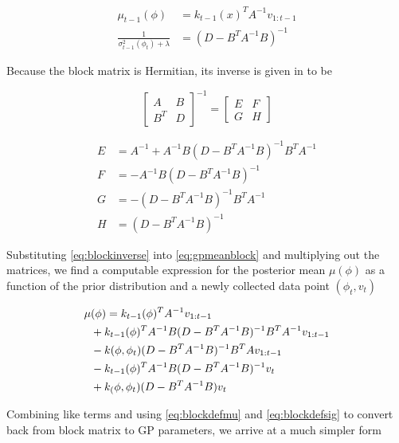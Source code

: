 \documentclass[letterpaper, 10 pt, conference]{ieeeconf}  %
\begin{document}
\begin{align}
    \mu_{t-1}(\phi) &= k_{t-1}(x)^T A^{-1} v_{1:t-1} \label{eq:blockdefmu}\\ 
    \frac{1}{\sigma_{t-1}^2(\phi_t)+\lambda} &= (D-B^T A^{-1}B)^{-1} \label{eq:blockdefsig}
\end{align}
\smallskip

Because the block matrix is Hermitian, its inverse is given in \cite{lu02} to be

\begin{equation}
    \begin{bmatrix}
        A & B \\
        B^T & D
    \end{bmatrix}^{-1}
    =
    \begin{bmatrix}
        E & F \\
        G & H
    \end{bmatrix}
    \label{eq:blockinverse}
\end{equation}

\begin{align}
    E &= A^{-1}+A^{-1}B(D-B^T A^{-1} B)^{-1}B^T A^{-1} \nonumber \\
    F &= -A^{-1}B(D-B^T A^{-1} B)^{-1} \nonumber \\
    G &= -(D-B^T A^{-1} B)^{-1}B^T A^{-1} \nonumber \\
    H &= (D-B^T A^{-1} B)^{-1} \nonumber
\end{align}
\smallskip

Substituting \eqref{eq:blockinverse} into \eqref{eq:gpmeanblock} and multiplying out the matrices, we find a computable expression for the posterior mean $\mu(\phi)$ as a function of the prior distribution and a newly collected data point $(\phi_t,v_t)$

\begin{align}
\begin{split}
    \tiny
    \mu&(\phi) = k_{t-1}(\phi)^T A^{-1} v_{1:t-1} \\
    &+ k_{t-1}(\phi)^T A^{-1} B (D-B^T A^{-1} B)^{-1} B^T A^{-1} v_{1:t-1} \\
    &- k(\phi,\phi_t)(D-B^T A^{-1} B)^{-1} B^T A v_{1:t-1} \\
    &- k_{t-1}(\phi)^T A^{-1} B(D-B^T A^{-1}B)^{-1}v_t \\
    &+ k_(\phi,\phi_t)(D-B^T A^{-1}B)v_t
\end{split}
\end{align}

Combining like terms and using \eqref{eq:blockdefmu} and \eqref{eq:blockdefsig} to convert back from block matrix to GP parameters, we arrive at a much simpler form
\end{document}
